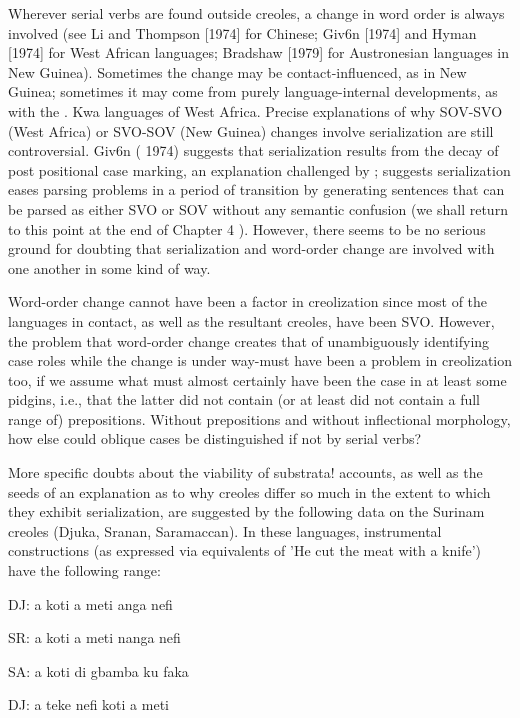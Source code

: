 Wherever serial verbs are found outside creoles, a change in word order is always involved (see Li and Thompson [1974] for Chinese; Giv6n [1974] and Hyman [1974] for West African languages; Brad\-shaw [1979] for Austronesian languages in New Guinea). Sometimes the change may be contact-influenced, as in New Guinea; sometimes it may come from purely language-internal developments, as with the . Kwa languages of West Africa. Precise explanations of why SOV-SVO (West Africa) or SVO-SOV (New Guinea) changes involve serialization are still controversial. Giv6n ( 1974) suggests that serialization results from the decay of post positional case marking, an explanation chal\-lenged by \citet{Hyman1974}; \citet{Bradshaw1979} suggests serialization eases parsing problems in a period of transition by generating sentences that can be parsed as either SVO or SOV without any semantic confu\-sion (we shall return to this point at the end of Chapter 4 ). However, there seems to be no serious ground for doubting that serialization and word-order change are involved with one another in some kind of way.

Word-order change cannot have been a factor in creolization since most of the languages in contact, as well as the resultant creoles, have been SVO. However, the problem that word-order change creates\-
that of unambiguously identifying case roles while the change is under way-must have been a problem in creolization too, if we assume what must almost certainly have been the case in at least some pidgins, i.e., that the latter did not contain (or at least did not contain a full range of) prepositions. Without prepositions and without inflectional morphology, how else could oblique cases be distinguished if not by serial verbs?

More specific doubts about the viability of substrata! accounts, as well as the seeds of an explanation as to why creoles differ so much in the extent to which they exhibit serialization, are suggested by the following data on the Surinam creoles (Djuka, Sranan, Saramaccan). In these languages, instrumental constructions (as expressed via equiva\-lents of 'He cut the meat with a knife') have the following range:

\ea\label{ex:228}
 DJ: a koti a meti anga nefi
\glt
\z

\ea\label{ex:229}
 SR: a koti a meti nanga nefi
\glt
\z

\ea\label{ex:230}
 SA: a koti di gbamba ku faka
\glt
\z

\ea\label{ex:231}
 DJ: a teke nefi koti a meti
\glt
\z

